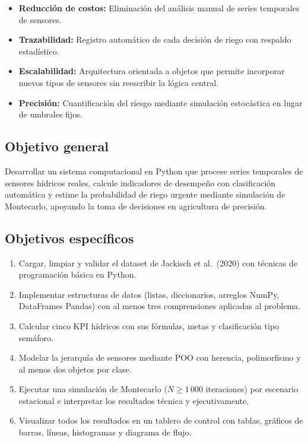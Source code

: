 \documentclass[12pt,a4paper]{article}
\begin{document}
\begin{itemize}[noitemsep]
    \item \textbf{Reducción de costos:} Eliminación del análisis manual de series temporales de sensores.
    \item \textbf{Trazabilidad:} Registro automático de cada decisión de riego con respaldo estadístico.
    \item \textbf{Escalabilidad:} Arquitectura orientada a objetos que permite incorporar nuevos tipos de sensores sin reescribir la lógica central.
    \item \textbf{Precisión:} Cuantificación del riesgo mediante simulación estocástica en lugar de umbrales fijos.
\end{itemize}

\subsection{Objetivo general}

Desarrollar un sistema computacional en Python que procese series temporales de sensores hídricos reales, calcule indicadores de desempeño con clasificación automática y estime la probabilidad de riego urgente mediante simulación de Montecarlo, apoyando la toma de decisiones en agricultura de precisión.

\subsection{Objetivos específicos}

\begin{enumerate}[noitemsep]
    \item Cargar, limpiar y validar el dataset de Jackisch et al.\ (2020) con técnicas de programación básica en Python.
    \item Implementar estructuras de datos (listas, diccionarios, arreglos NumPy, DataFrames Pandas) con al menos tres comprensiones aplicadas al problema.
    \item Calcular cinco KPI hídricos con sus fórmulas, metas y clasificación tipo semáforo.
    \item Modelar la jerarquía de sensores mediante POO con herencia, polimorfismo y al menos dos objetos por clase.
    \item Ejecutar una simulación de Montecarlo ($N \geq 1\,000$ iteraciones) por escenario estacional e interpretar los resultados técnica y ejecutivamente.
    \item Visualizar todos los resultados en un tablero de control con tablas, gráficos de barras, líneas, histogramas y diagrama de flujo.
\end{enumerate}
\end{document}
